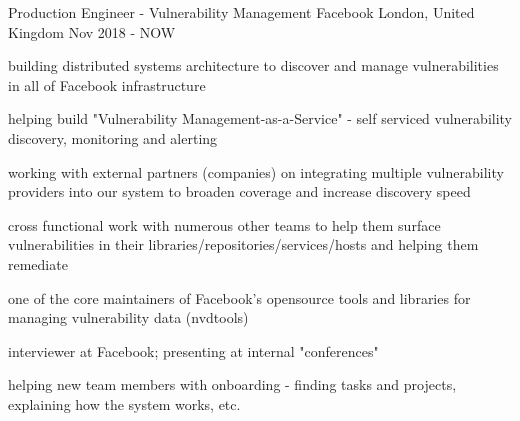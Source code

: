 
\begin{cventries}

  \cventry
    {Production Engineer - Vulnerability Management} %
    {Facebook} %
    {London, United Kingdom} %
    {Nov 2018 - NOW} %
    {
      \begin{cvitems} %
        \item {building distributed systems architecture to discover and manage vulnerabilities in all of Facebook infrastructure}
        \item {helping build "Vulnerability Management-as-a-Service" - self serviced vulnerability discovery, monitoring and alerting}
        \item {working with external partners (companies) on integrating multiple vulnerability providers into our system to broaden coverage and increase discovery speed}
        \item {cross functional work with numerous other teams to help them surface vulnerabilities in their libraries/repositories/services/hosts and helping them remediate}
        \item {one of the core maintainers of Facebook's opensource tools and libraries for managing vulnerability data (nvdtools)}
        \item {interviewer at Facebook; presenting at internal "conferences"}
        \item {helping new team members with onboarding - finding tasks and projects, explaining how the system works, etc.}
      \end{cvitems}
    }


\end{cventries}
